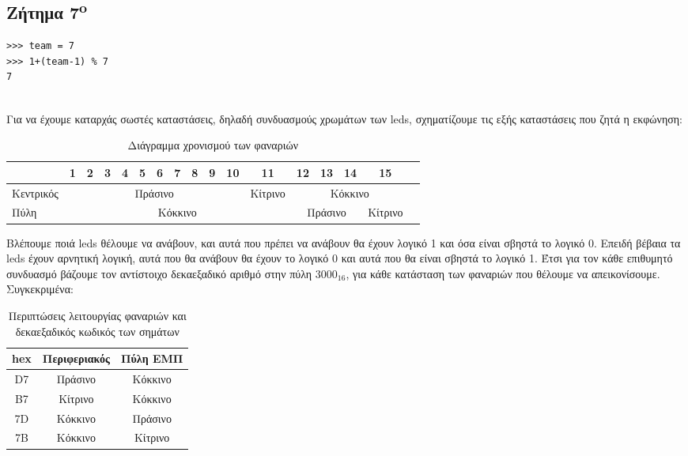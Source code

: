 \documentclass[a4paper,10pt]{article} \usepackage{anysize}
\begin{document}


\begin{minipage}{0.4\textwidth}
\begin{flushleft}
\section*{Ζήτημα 7\textsuperscript{o}}
\end{flushleft}
\end{minipage}
\begin{minipage}{0.3\textwidth}
\begin{flushright}
\begin{verbatim}
>>> team = 7
>>> 1+(team-1) % 7
7
\end{verbatim}
\end{flushright}
\end{minipage}\\[0.5cm]

Για να έχουμε καταρχάς σωστές καταστάσεις, δηλαδή συνδυασμούς χρωμάτων των
leds, σχηματίζουμε τις εξής καταστάσεις που ζητά η εκφώνηση: 

\begin{table}[h]
\centering
	\begin{tabular}{|l|c|c|c|c|c|c|c|c|c|c|c|c|c|c|c|c|}
	\hline
	& 1 & 2 & 3 & 4 & 5 & 6 & 7 & 8 & 9 & 10 & 11 & 12 & 13 & 14 & 15\\
	\hline
	Κεντρικός & \multicolumn{10}{c|}{\cellcolor{green}Πράσινο} &
	\cellcolor{yellow}Κίτρινο & \multicolumn{4}{c|}{\cellcolor{red}Κόκκινο}\\
	\hline
	Πύλη & \multicolumn{11}{c}{\cellcolor{red}Κόκκινο} &
	\multicolumn{3}{c|}{\cellcolor{green}Πράσινο} & \cellcolor{yellow}Κίτρινο\\
	\hline
	\end{tabular}
	\caption{Διάγραμμα χρονισμού των φαναριών}
\end{table}

Βλέπουμε ποιά leds θέλουμε να ανάβουν, και αυτά που πρέπει να ανάβουν θα έχουν
λογικό 1 και όσα είναι σβηστά το λογικό 0. Επειδή βέβαια τα leds έχουν
αρνητική λογική, αυτά που θα ανάβουν θα έχουν το λογικό 0 και αυτά που θα
είναι σβηστά το λογικό 1. Έτσι για τον κάθε επιθυμητό συνδυασμό βάζουμε τον
αντίστοιχο δεκαεξαδικό αριθμό στην πύλη $3000_{16}$, για κάθε κατάσταση των
φαναριών που θέλουμε να απεικονίσουμε. Συγκεκριμένα:

\begin{table}[h]
\centering
	\begin{tabular}{|c|c|c|}
	\hline
	hex&Περιφεριακός & Πύλη ΕΜΠ\\
	\hline
	D7&\cellcolor{green}Πράσινο&\cellcolor{red}Κόκκινο\\
	\hline
	B7&\cellcolor{yellow}Κίτρινο&\cellcolor{red}Κόκκινο\\
	\hline
	7D&\cellcolor{red}Κόκκινο&\cellcolor{green}Πράσινο\\
	\hline
	7B&\cellcolor{red}Κόκκινο&\cellcolor{yellow}Κίτρινο\\
	\hline
	\end{tabular}
	\caption{Περιπτώσεις λειτουργίας φαναριών και δεκαεξαδικός κωδικός των
	σημάτων}
\end{table}
\end{document}
